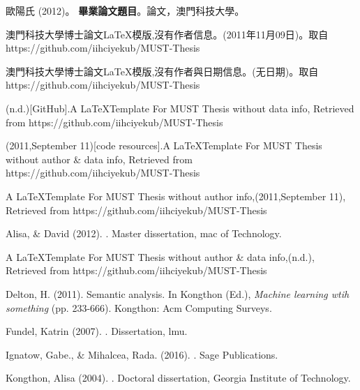 \begin{thebibliography}{}
歐陽氏 (2012)。
\newblock \textbf{畢業論文題目}。論文，澳門科技大學。

澳門科技大學博士論文\LaTeX 模版,沒有作者信息。(2011年11月09日)。取自 https://github.com/iihciyekub/MUST-Thesis

澳門科技大學博士論文\LaTeX 模版,沒有作者與日期信息。(无日期)。取自 https://github.com/iihciyekub/MUST-Thesis


\iiname(n.d.)[GitHub].A \LaTeX Template For MUST Thesis without data info, Retrieved from https://github.com/iihciyekub/MUST-Thesis

\iiname(2011,September 11)[code resources].A \LaTeX Template For MUST Thesis without author \& data info, Retrieved from https://github.com/iihciyekub/MUST-Thesis

A \LaTeX Template For MUST Thesis without author info,(2011,September 11), Retrieved from https://github.com/iihciyekub/MUST-Thesis

Alisa, \& David (2012).
. Master dissertation,  mac of Technology.

A \LaTeX Template For MUST Thesis without author \& data info,(n.d.), Retrieved from https://github.com/iihciyekub/MUST-Thesis

Delton, H. (2011).
\newblock  Semantic analysis. In Kongthon (Ed.), {\em Machine learning wtih something} (pp. 233-666). Kongthon: Acm Computing Surveys.

Fundel, Katrin (2007).
. Dissertation, lmu.

Ignatow, Gabe., \& Mihalcea, Rada. (2016).
. Sage Publications.

Kongthon, Alisa (2004).
. Doctoral dissertation, Georgia Institute of Technology.


\end{thebibliography}
